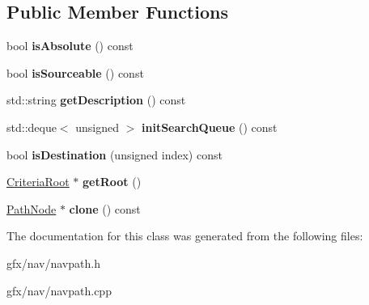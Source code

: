 \subsection*{Public Member Functions}
\begin{DoxyCompactItemize}
\item 
bool {\bfseries is\+Absolute} () const \hypertarget{classCriteriaPathNode_a648c9340a15f8fccb101eaee83966e90}{}\label{classCriteriaPathNode_a648c9340a15f8fccb101eaee83966e90}

\item 
bool {\bfseries is\+Sourceable} () const \hypertarget{classCriteriaPathNode_a31d6cdefecbfe832bae8eaeae5a2d70c}{}\label{classCriteriaPathNode_a31d6cdefecbfe832bae8eaeae5a2d70c}

\item 
std\+::string {\bfseries get\+Description} () const \hypertarget{classCriteriaPathNode_a62fae8cb03445e4f861907097a680cfc}{}\label{classCriteriaPathNode_a62fae8cb03445e4f861907097a680cfc}

\item 
std\+::deque$<$ unsigned $>$ {\bfseries init\+Search\+Queue} () const \hypertarget{classCriteriaPathNode_a7c162f113e371cda232b7cb3b2d293ad}{}\label{classCriteriaPathNode_a7c162f113e371cda232b7cb3b2d293ad}

\item 
bool {\bfseries is\+Destination} (unsigned index) const \hypertarget{classCriteriaPathNode_aa6b4bd80b7f69253382bfc5410ebf7c1}{}\label{classCriteriaPathNode_aa6b4bd80b7f69253382bfc5410ebf7c1}

\item 
\hyperlink{classCriteriaRoot}{Criteria\+Root} $\ast$ {\bfseries get\+Root} ()\hypertarget{classCriteriaPathNode_adf1276fc189cc3b602c859c86c835b12}{}\label{classCriteriaPathNode_adf1276fc189cc3b602c859c86c835b12}

\item 
\hyperlink{classPathNode}{Path\+Node} $\ast$ {\bfseries clone} () const \hypertarget{classCriteriaPathNode_ae16fdd55c8e1d80f3101a91d2a94719f}{}\label{classCriteriaPathNode_ae16fdd55c8e1d80f3101a91d2a94719f}

\end{DoxyCompactItemize}


The documentation for this class was generated from the following files\+:\begin{DoxyCompactItemize}
\item 
gfx/nav/navpath.\+h\item 
gfx/nav/navpath.\+cpp\end{DoxyCompactItemize}

